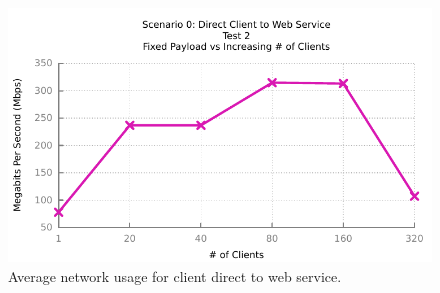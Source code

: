 \begin{figure}[H]
	\caption{Average network usage for client direct to web service.}
	\centerline{\includegraphics{img/direct_fp_iu_kbs}}
	\label{fig:direct-2-3}
\end{figure}